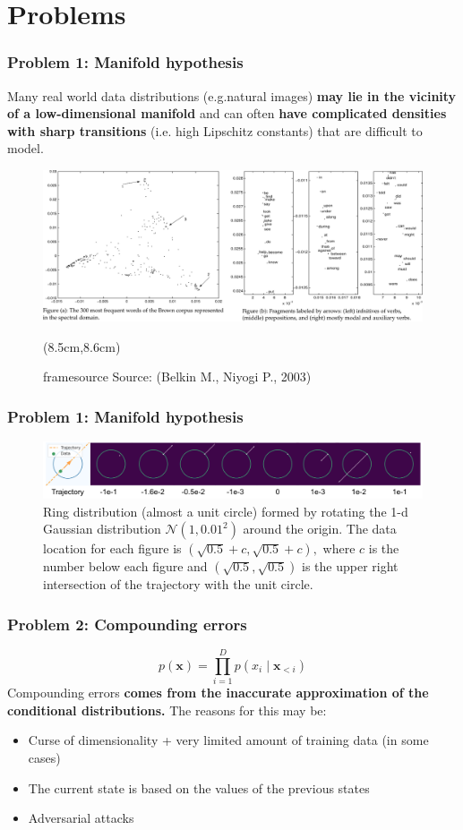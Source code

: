 \documentclass[t]{beamer}  %
\newcommand{\source}[1]{\begin{textblock*}{4.2cm}(8.5cm,8.6cm)
    \begin{beamercolorbox}[ht=0.5cm,right]{framesource}
        \usebeamerfont{framesource}\usebeamercolor[fg]{framesource} Source: {#1}
    \end{beamercolorbox}
\end{textblock*}}
\begin{document}
\section{Problems}
\begin{frame}
\frametitle{Problem 1: Manifold hypothesis}
Many real world data distributions (e.g.natural images) 
\newline
\textbf{may lie in the vicinity of a low-dimensional manifold} and can often \textbf{have complicated densities with sharp transitions} (i.e. high Lipschitz constants) that are difficult to model.
\begin{figure}[h]
\includegraphics[width=\textwidth]{images/laplas.pdf}
\source{(Belkin M., Niyogi P., 2003) \cite{laplas}}
\end{figure}
\end{frame}

\begin{frame}[c]
\frametitle{Problem 1: Manifold hypothesis}
\begin{figure}[hp]

\includegraphics[width=\textwidth]{images/sharp.png}
\caption{ Ring distribution (almost a unit circle) formed by rotating the 1-d Gaussian distribution $\mathcal{N}\left(1,0.01^{2}\right)$ around the origin. The data location for each figure is $(\sqrt{0.5}+c, \sqrt{0.5}+c),$ where $c$ is the number below each figure and $(\sqrt{0.5}, \sqrt{0.5})$ is the upper right intersection of the trajectory with the unit circle. \cite{orig}
}
\end{figure}
\end{frame}

\begin{frame}[h]
\frametitle{Problem 2: Compounding errors}
$$
p(\bm{x})=\prod_{i=1}^{D} p\left(x_{i} \mid \bm{x}_{<i}\right)
$$
Compounding errors \textbf{comes from the inaccurate approximation of the conditional distributions.}  
\newline
\newline
The reasons for this may be:
\begin{itemize}
\item Curse of dimensionality + very limited amount of training data (in some cases)
\item The current state is based on the values of the previous states
\item Adversarial attacks
\end{itemize}
\end{frame}
\end{document}
